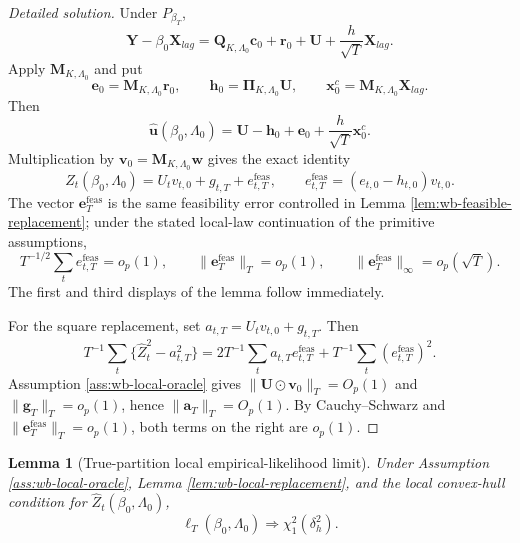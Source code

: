 \documentclass[12pt]{article}
\numberwithin{equation}{section}
\newtheorem{lemma}{Lemma}
\theoremstyle{definition}
\begin{document}
\begin{proof}[Detailed solution]
Under \(P_{\beta_T}\),
\[
    \bm Y-\beta_0\bm X_{lag}
    =\bm Q_{K,\Lambda_0}\bm c_0+
      \bm r_0+\bm U+\frac{h}{\sqrt T}\bm X_{lag}.
\]
Apply \(\bm M_{K,\Lambda_0}\) and put
\[
    \bm e_0=\bm M_{K,\Lambda_0}\bm r_0,
    \qquad
    \bm h_0=\bm\Pi_{K,\Lambda_0}\bm U,
    \qquad
    \bm x_0^c=\bm M_{K,\Lambda_0}\bm X_{lag}.
\]
Then
\[
    \widehat{\bm u}(\beta_0,\Lambda_0)
    =\bm U-\bm h_0+\bm e_0+\frac{h}{\sqrt T}\bm x_0^c.
\]
Multiplication by \(\bm v_0=\bm M_{K,\Lambda_0}\bm w\) gives the exact
identity
\[
    \widehat Z_t(\beta_0,\Lambda_0)
    =U_tv_{t,0}+g_{t,T}+e^{\mathrm{feas}}_{t,T},
    \qquad
    e^{\mathrm{feas}}_{t,T}=(e_{t,0}-h_{t,0})v_{t,0}.
\]
The vector \(\bm e_T^{\mathrm{feas}}\) is the same feasibility error controlled
in Lemma \ref{lem:wb-feasible-replacement}; under the stated local-law
continuation of the primitive assumptions,
\[
    T^{-1/2}\sum_te^{\mathrm{feas}}_{t,T}=o_p(1),
    \qquad
    \|\bm e_T^{\mathrm{feas}}\|_T=o_p(1),
    \qquad
    \|\bm e_T^{\mathrm{feas}}\|_\infty=o_p(\sqrt T).
\]
The first and third displays of the lemma follow immediately.

For the square replacement, set \(a_{t,T}=U_tv_{t,0}+g_{t,T}\).  Then
\[
    T^{-1}\sum_t\{\widehat Z_t^2-a_{t,T}^2\}
    =2T^{-1}\sum_ta_{t,T}e^{\mathrm{feas}}_{t,T}
      +T^{-1}\sum_t(e^{\mathrm{feas}}_{t,T})^2.
\]
Assumption \ref{ass:wb-local-oracle} gives
\(\|\bm U\odot\bm v_0\|_T=O_p(1)\) and
\(\|\bm g_T\|_T=o_p(1)\), hence \(\|\bm a_T\|_T=O_p(1)\).  By
Cauchy--Schwarz and \(\|\bm e_T^{\mathrm{feas}}\|_T=o_p(1)\), both terms on the right are
\(o_p(1)\).
\end{proof}


\begin{lemma}[True-partition local empirical-likelihood limit]
\label{lem:wb-local-true-el}
Under Assumption \ref{ass:wb-local-oracle}, Lemma
\ref{lem:wb-local-replacement}, and the local convex-hull condition for
\(\widehat Z_t(\beta_0,\Lambda_0)\),
\[
    \ell_T(\beta_0,\Lambda_0)
    \Rightarrow\chi_1^2(\delta_h^2).
\]
\end{lemma}
\end{document}
